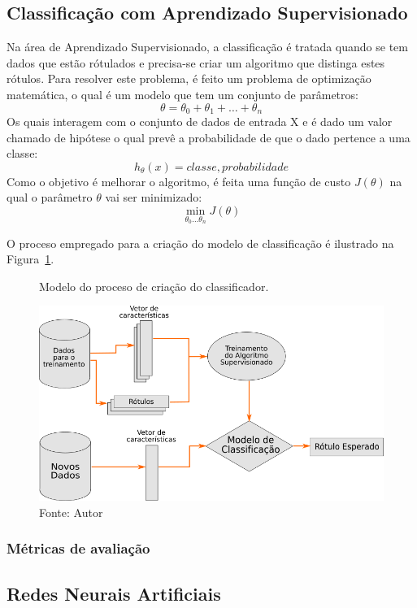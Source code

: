 \documentclass[
	12pt,				%
	openright,			%
	oneside,			%
	a4paper,			%
	english,			%
	brazil				%
	]{abntex2}
\begin{document}
\subsection{Classificação com Aprendizado Supervisionado}
Na área de Aprendizado Supervisionado, a classificação é tratada quando se tem dados que estão rótulados e precisa-se criar um algoritmo que distinga estes rótulos. Para resolver este problema, é feito um problema de optimização matemática, o qual é um modelo que tem um conjunto de parâmetros: $$\theta = \theta_{0} + \theta_{1} + \dots + \theta_{n}$$
Os quais interagem com o conjunto de dados de entrada X e é dado um valor chamado de hipótese o qual prevê a probabilidade de que o dado pertence a uma classe: $$h_{\theta}(x) = classe, probabilidade$$
Como o objetivo é melhorar o algoritmo, é feita uma função de custo $J(\theta)$ na qual o parâmetro $\theta$ vai ser minimizado: $$\min_{\theta_{0}\dots \theta_{n}} J(\theta)$$

O proceso empregado para a criação do modelo de classificação é ilustrado na Figura~\ref{fig:classificacao}.

\begin{figure}[!h]
    \centering
    \caption{Modelo do proceso de criação do classificador.}
    \includegraphics[scale=.7]{figures/classificacao.png}
    \caption*{Fonte: Autor}
    \label{fig:classificacao}
\end{figure}

\subsubsection{Métricas de avaliação}

\subsection{Redes Neurais Artificiais}
\end{document}
